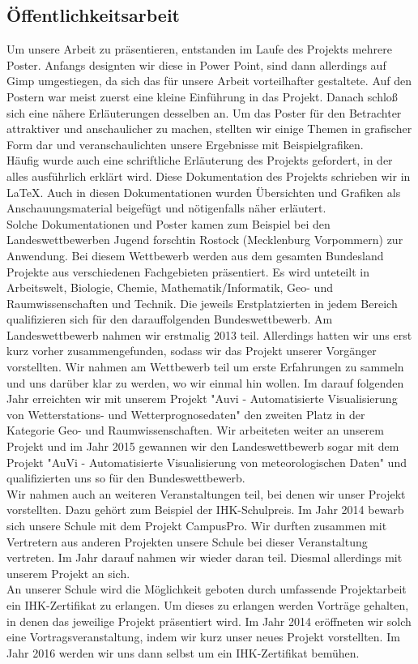 \documentclass[a4paper,oneside,10pt,titlepage]{article}
\newcommand{\jf}{Jugend forscht}
\begin{document}
\subsection{Öffentlichkeitsarbeit}
Um unsere Arbeit zu präsentieren, entstanden im Laufe des Projekts mehrere Poster. Anfangs designten wir diese in Power Point, sind dann allerdings auf Gimp umgestiegen, da sich das für unsere Arbeit vorteilhafter gestaltete. Auf den Postern war meist zuerst eine kleine Einführung in das Projekt. Danach schloß sich eine nähere Erläuterungen desselben an. Um das Poster für den Betrachter attraktiver und anschaulicher zu machen, stellten wir einige Themen in grafischer Form dar und veranschaulichten unsere Ergebnisse mit Beispielgrafiken. \\
Häufig wurde auch eine schriftliche Erläuterung des Projekts gefordert, in der alles ausführlich erklärt wird. Diese Dokumentation des Projekts schrieben wir in \LaTeX . Auch in diesen Dokumentationen wurden Übersichten und Grafiken als Anschauungsmaterial beigefügt und nötigenfalls näher erläutert.\\
Solche Dokumentationen und Poster kamen zum Beispiel bei den Landeswettbewerben \jf in Rostock (Mecklenburg Vorpommern) zur Anwendung. Bei diesem Wettbewerb werden aus dem gesamten Bundesland Projekte aus verschiedenen Fachgebieten präsentiert. Es wird unteteilt in Arbeitswelt, Biologie, Chemie, Mathematik/Informatik, Geo- und Raumwissenschaften und Technik. Die jeweils Erstplatzierten in jedem Bereich qualifizieren sich für den darauffolgenden Bundeswettbewerb. Am Landeswettbewerb nahmen wir erstmalig 2013 teil. Allerdings hatten wir uns erst kurz vorher zusammengefunden, sodass wir das Projekt unserer Vorgänger vorstellten. Wir nahmen am Wettbewerb teil um erste Erfahrungen zu sammeln und uns darüber klar zu werden, wo wir einmal hin wollen. Im darauf folgenden Jahr erreichten wir mit unserem Projekt "Auvi - Automatisierte Visualisierung von Wetterstations- und Wetterprognosedaten" den zweiten Platz in der Kategorie Geo- und Raumwissenschaften. Wir arbeiteten weiter an unserem Projekt und im Jahr 2015 gewannen wir den Landeswettbewerb sogar mit dem Projekt "AuVi - Automatisierte Visualisierung von meteorologischen Daten" und qualifizierten uns so für den Bundeswettbewerb.\\
Wir nahmen auch an weiteren Veranstaltungen teil, bei denen wir unser Projekt vorstellten. Dazu gehört zum Beispiel der IHK-Schulpreis. Im Jahr 2014 bewarb sich unsere Schule mit dem Projekt CampusPro. Wir durften zusammen mit Vertretern aus anderen Projekten unsere Schule bei dieser Veranstaltung vertreten. Im Jahr darauf nahmen wir wieder daran teil. Diesmal allerdings mit unserem Projekt an sich.\\ An unserer Schule wird die Möglichkeit geboten durch umfassende Projektarbeit ein IHK-Zertifikat zu erlangen. Um dieses zu erlangen werden Vorträge gehalten, in denen das jeweilige Projekt präsentiert wird. Im Jahr 2014 eröffneten wir solch eine Vortragsveranstaltung, indem wir kurz unser neues Projekt vorstellten. Im Jahr 2016 werden wir uns dann selbst um ein IHK-Zertifikat bemühen.
\end{document}
